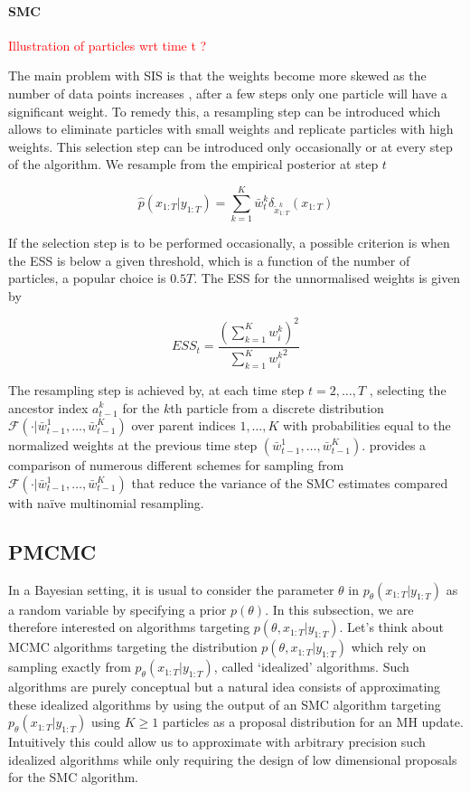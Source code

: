 \paragraph{\gls{SMC}}
\textcolor{red}{Illustration of particles wrt time t ?}

The main problem with \gls{SIS} is that the weights become more skewed as the number of data points increases \cite{Anonymous:2001ue}, after a few steps only one particle will have a significant weight. To remedy this, a resampling step can be introduced which allows to eliminate particles with small weights and replicate particles with high weights. This selection step can be introduced only occasionally or at every step of the algorithm. We resample from the empirical posterior at step $t$

$$ \hat{p}(x_{1:T}|y_{1:T}) = \sum_{k=1}^K \bar{w}_t^k \delta_{\tilde{x}_{1:T}^k} ({x}_{1:T})$$

If the selection step is to be performed occasionally, a possible criterion is when the \gls{ESS} is below a given threshold, which is a function of the number of particles, a popular choice is $0.5T$. The \gls{ESS} for the unnormalised weights is given by

$$ ESS_t = \frac{{\left( \sum_{k=1}^K{w_i^k} \right)}^2}{\sum_{k=1}^K{{w_i^k}^2}}$$




The resampling step is achieved by, at each time step $t = 2, \dots , T$ ,
selecting the ancestor index $a^k_{t-1}$ for the $k$th particle from a discrete distribution 
$\mathcal{F} (\cdot|\bar{w}^1_{t-1},\dots, \bar{w}^K_{t-1})$
over parent indices ${1, \dots , K }$ with probabilities equal to the normalized weights at the previous time step $(\bar{w}^1_{t-1},\dots, \bar{w}^K_{t-1})$. \cite{Douc:2005wa} provides a comparison of numerous different schemes
for sampling from $\mathcal{F} (\cdot|\bar{w}^1_{t-1},\dots, \bar{w}^K_{t-1})$ that reduce the variance of the \gls{SMC} estimates compared with naïve multinomial resampling.


\subsection{\gls{PMCMC}}
In a Bayesian setting, it is usual to consider the parameter $\theta$ in $p_\theta(x_{1:T}|y_{1:T})$ as a random variable by specifying a prior $p(\theta)$. In this subsection, we are therefore interested on algorithms targeting
$p(\theta, x_{1:T}|y_{1:T})$.
Let's think about \gls{MCMC} algorithms targeting the distribution $p(\theta, x_{1:T}|y_{1:T})$ which rely on sampling exactly from $p_\theta(x_{1:T}|y_{1:T})$, called ‘idealized’ algorithms.
Such algorithms are purely conceptual but a natural idea consists of approximating these idealized algorithms by using the output of an \gls{SMC} algorithm targeting $p_\theta(x_{1:T}|y_{1:T})$ using $K \ge 1$ particles as a proposal distribution for an \gls{MH} update.
Intuitively this could allow us to approximate with arbitrary precision such idealized algorithms while only requiring the design of low dimensional proposals for the \gls{SMC} algorithm.

